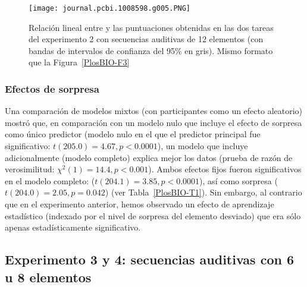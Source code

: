 \begin{figure}[t!]
   \texttt{[image: journal.pcbi.1008598.g005.PNG]}
   \centering
   \caption{Relación lineal entre \mdlbin y las puntuaciones obtenidas en las dos tareas del experimento 2 con secuencias auditivas de 12 elementos (con bandas de intervalos de confianza del 95\% en gris). Mismo formato que la Figura~\ref{PlosBIO-F3}}
   \label{PlosBIO-F5}
\end{figure}

\subsubsection*{Efectos de sorpresa}

Una comparación de modelos mixtos (con participantes como un efecto aleatorio) mostró que, en comparación con un modelo nulo que incluye el efecto de sorpresa como único predictor (modelo nulo en el que el predictor principal fue significativo: $t (205.0) = 4.67, p < 0.0001$), un modelo que incluye adicionalmente \mdlbin (modelo completo) explica mejor los datos (prueba de razón de verosimilitud: $\chi^2(1) = 14.4, p < 0.001$). Ambos efectos fijos fueron significativos en el modelo completo: \mdlbin ($t (204.1) = 3.85, p < 0.0001$), así como sorpresa ($t (204.0) = 2.05, p= 0.042$) (ver Tabla~\ref{PlosBIO-T1}). Sin embargo, al contrario que en el experimento anterior, hemos observado un efecto de aprendizaje estadístico (indexado por el nivel de sorpresa del elemento desviado) que era sólo apenas estadísticamente significativo.

\subsection{Experimento 3 y 4: secuencias auditivas con 6 u 8 elementos}

